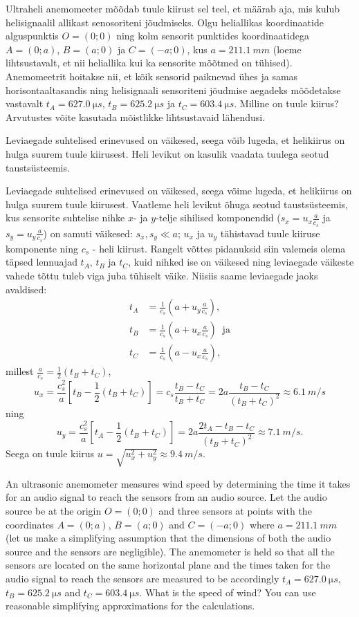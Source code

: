 
Ultraheli anemomeeter mõõdab tuule kiirust sel teel, et määrab aja, mis kulub helisignaalil allikast senosoriteni jõudmiseks.
Olgu heliallikas koordinaatide alguspunktis $O=(0;0)$ ning kolm sensorit punktides koordinaatidega $A=(0;a)$, $B=(a;0)$ ja $C=(-a;0)$, 
kus $a=\SI{211.1}{mm}$ (loeme lihtsustavalt, et nii heliallika kui ka sensorite mõõtmed on tühised). 
Anemomeetrit hoitakse nii, et kõik sensorid paiknevad ühes ja samas horisontaaltasandis ning helisignaali 
sensoriteni jõudmise aegadeks mõõdetakse vastavalt $t_A=\SI{627,0}{\micro s}$, $t_B=\SI{625,2}{\micro s}$ ja $t_C=\SI{603,4}{\micro s}$. 
Milline on tuule kiirus? Arvutustes võite kasutada mõistlikke lihtsustavaid lähendusi.

\hint
Leviaegade suhtelised erinevused on väikesed, seega võib lugeda, et helikiirus on hulga suurem tuule kiirusest. Heli levikut on kasulik vaadata tuulega seotud taustsüsteemis.

\solu
Leviaegade suhtelised erinevused on väikesed, seega võime lugeda, et helikiirus on hulga suurem tuule kiirusest.
Vaatleme heli levikut õhuga seotud taustsüsteemis, kus sensorite suhtelise nihke $x$- ja $y$-telje sihilised komponendid ($s_x=u_x\frac a{c_s}$ ja 
$s_y=u_y\frac a{c_s}$) on samuti väikesed: $s_x, s_y\ll a$; $u_x$ ja $u_y$ tähistavad tuule kiiruse komponente ning $c_s$ - heli kiirust.
Rangelt võttes pidanuksid siin valemeis olema täpsed lennuajad $t_A$, $t_B$ ja $t_C$, kuid nihked ise on väikesed ning leviaegade 
väikeste vahede tõttu tuleb viga juba tühiselt väike. Niisiis saame leviaegade jaoks avaldised:
\begin{align*}
t_A&=\frac 1{c_s}\left(a+u_y\frac a{c_s}\right),\\
t_B&=\frac 1{c_s}\left(a+u_x\frac a{c_s}\right)\;\; \mbox{ja}\\
t_C&=\frac 1{c_s}\left(a-u_x\frac a{c_s}\right),
\end{align*}
millest $ \frac a{c_s}=\frac 12(t_B+t_C)$, $$u_x=\frac {c_s^2}a\left[t_B-\frac 12(t_B+t_C)\right]=c_s\frac{t_B-t_C}{t_B+t_C}=2a\frac{t_B-t_C}{(t_B+t_C)^2}\approx \SI{6.1}{m/s}$$
ning 
$$u_y=\frac {c_s^2}a\left[t_A-\frac 12(t_B+t_C)\right]=2a\frac{2t_A-t_B-t_C}{(t_B+t_C)^2}\approx \SI{7.1}{m/s}.$$
Seega on tuule kiirus $u=\sqrt{u_x^2+u_y^2}\approx \SI{9.4}{m/s}$.

An ultrasonic anemometer measures wind speed by determining the time it takes for an audio signal to reach the sensors from an audio source. Let the audio source be at the origin $O=(0;0)$ and three sensors at points with the coordinates $A=(0;a)$, $B=(a;0)$ and $C=(-a;0)$ where $a=\SI{211.1}{mm}$ (let us make a simplifying assumption that the dimensions of both the audio source and the sensors are negligible). The anemometer is held so that all the sensors are located on the same horizontal plane and the times taken for the audio signal to reach the sensors are measured to be accordingly $t_A=\SI{627,0}{\micro s}$, $t_B=\SI{625,2}{\micro s}$ and $t_C=\SI{603,4}{\micro s}$. What is the speed of wind? You can use reasonable simplifying approximations for the calculations.

